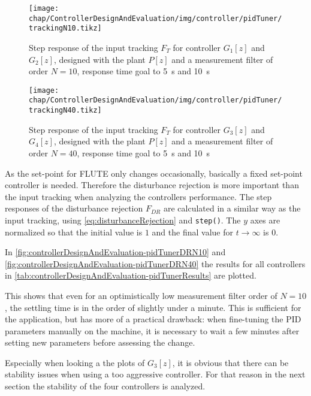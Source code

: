 \begin{figure}[tb]
	\centering
	\texttt{[image: chap/ControllerDesignAndEvaluation/img/controller/pidTuner/trackingN10.tikz]}
	\caption{Step response of the input tracking $F_T$ for controller $G_1[z]$ and $G_2[z]$, designed with the plant $P[z]$ and a measurement filter of order $N=10$, response time goal to \SI{5}{\second} and \SI{10}{\second}}
	\label{fig:controllerDesignAndEvaluation-pidTunerITN10}
\end{figure}

\begin{figure}[tb]
	\centering
	\texttt{[image: chap/ControllerDesignAndEvaluation/img/controller/pidTuner/trackingN40.tikz]}
	\caption{Step response of the input tracking $F_T$ for controller $G_3[z]$ and $G_4[z]$, designed with the plant $P[z]$ and a measurement filter of order $N=40$, response time goal to \SI{5}{\second} and \SI{10}{\second}}
	\label{fig:controllerDesignAndEvaluation-pidTunerITN40}
\end{figure}

As the set-point for FLUTE only changes occasionally, basically a fixed set-point controller is needed. Therefore the disturbance rejection is more important than the input tracking when analyzing the controllers performance. The step responses of the disturbance rejection $F_{DR}$ are calculated in a similar way as the input tracking, using \autoref{eq:disturbanceRejection} and \texttt{step()}. The $y$ axes are normalized so that the initial value is $1$ and the final value for $t \rightarrow \infty$ is $0$.

In \autoref{fig:controllerDesignAndEvaluation-pidTunerDRN10} and \autoref{fig:controllerDesignAndEvaluation-pidTunerDRN40} the results for all controllers in \autoref{tab:controllerDesignAndEvaluation-pidTunerResults} are plotted.

This shows that even for an optimistically low measurement filter order of $N=10$, the settling time is in the order of slightly under a minute. This is sufficient for the application, but has more of a practical drawback: when fine-tuning the PID parameters manually on the machine, it is necessary to wait a few minutes after setting new parameters before assessing the change.

Especially when looking a the plots of $G_3[z]$, it is obvious that there can be stability issues when using a too aggressive controller. For that reason in the next section the stability of the four controllers is analyzed.

